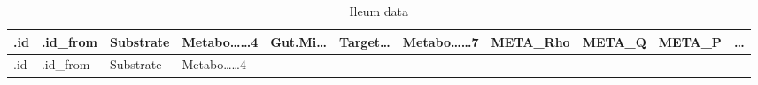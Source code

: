 \documentclass[
]{article}
\begin{document}
\begin{longtable}[]{@{}lllllllllll@{}}
\caption{\label{tab:ileum-data}Ileum data}\tabularnewline
\toprule
\begin{minipage}[b]{0.03\columnwidth}\raggedright
.id\strut
\end{minipage} & \begin{minipage}[b]{0.07\columnwidth}\raggedright
.id\_from\strut
\end{minipage} & \begin{minipage}[b]{0.07\columnwidth}\raggedright
Substrate\strut
\end{minipage} & \begin{minipage}[b]{0.09\columnwidth}\raggedright
Metabo\ldots\ldots4\strut
\end{minipage} & \begin{minipage}[b]{0.07\columnwidth}\raggedright
Gut.Mi\ldots{}\strut
\end{minipage} & \begin{minipage}[b]{0.07\columnwidth}\raggedright
Target\ldots{}\strut
\end{minipage} & \begin{minipage}[b]{0.09\columnwidth}\raggedright
Metabo\ldots\ldots7\strut
\end{minipage} & \begin{minipage}[b]{0.07\columnwidth}\raggedright
META\_Rho\strut
\end{minipage} & \begin{minipage}[b]{0.07\columnwidth}\raggedright
META\_Q\strut
\end{minipage} & \begin{minipage}[b]{0.07\columnwidth}\raggedright
META\_P\strut
\end{minipage} & \begin{minipage}[b]{0.03\columnwidth}\raggedright
\ldots{}\strut
\end{minipage}\tabularnewline
\midrule
\endfirsthead
\toprule
\begin{minipage}[b]{0.03\columnwidth}\raggedright
.id\strut
\end{minipage} & \begin{minipage}[b]{0.07\columnwidth}\raggedright
.id\_from\strut
\end{minipage} & \begin{minipage}[b]{0.07\columnwidth}\raggedright
Substrate\strut
\end{minipage} & \begin{minipage}[b]{0.09\columnwidth}\raggedright
Metabo\ldots\ldots4\strut

\end{minipage}
\end{longtable}
\end{document}
